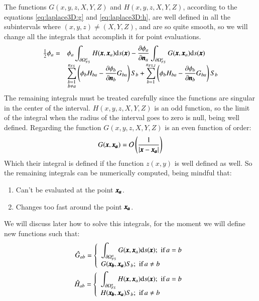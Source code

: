 %
The functions $G(x,y,z,X,Y,Z)$ and $H(x,y,z,X,Y,Z)$, according to the equations
\ref{eq:laplace3D:g} and \ref{eq:laplace3D:h}, are well defined in all the
subintervals where $(x,y,z) \neq (X,Y,Z)$, and are so quite smooth, so we will
change all the integrals that accomplish it for point evaluations.
%
\begin{eqnarray}
	\label{eq:laplace3D:reciprocal_relation:004}
	\begin{array}{rl}
	\frac{1}{2} \phi_a = &
		\phi_a
		\dsty \int_{\partial \Omega_{FS}^a} H(\bs{x}, \bs{x}_a) \mbox{d} s(\bs{x})
	-
		\frac{\partial \phi_a}{\partial \bs{n}_a}
		\dsty \int_{\partial \Omega_{FS}^a} G(\bs{x}, \bs{x}_a) \mbox{d} s(\bs{x})
	\\
	&
	\dsty \sum_{\substack{b = 1 \\ b \neq a}}^{n_{FS}}
	\left(
		\phi_b H_{ba} - \frac{\partial \phi_b}{\partial \bs{n}_b} G_{ba}
	\right) S_b
	+
	\dsty \sum_{b=1}^{n_{FS,I}}
	\left(
		\phi_b H_{ba} - \frac{\partial \phi_b}{\partial \bs{n}_b} G_{ba}
	\right) S_b
	\end{array}
\end{eqnarray}
%
The remaining integrals must be treated carefully since the functions are
singular in the center of the interval. $H(x,y,z,X,Y,Z)$ is an odd function,
so the limit of the integral when the radius of the interval goes to zero
is null, being well defined. Regarding the function $G(x,y,z,X,Y,Z)$ is an
even function of order:
%
\begin{eqnarray*}
	G(\bs{x},\bs{x_a}) = \mathcal{O}\left(\frac{1}{\vert \bs{x} - \bs{x_a}\vert}\right)
\end{eqnarray*}
%
Which their integral is defined if the function $z(x,y)$ is well defined
as well. So the remaining integrals can be numerically computed, being mindful
that:
%
\begin{enumerate}
	\item Can't be evaluated at the point $\bs{x_a}$.
	\item Changes too fast around the point $\bs{x_a}$.
\end{enumerate}
%
We will discuss later how to solve this integrals, for the moment we will define
new functions such that:
%
\begin{eqnarray}
	\label{eq:laplace3D:g:hat}
	\hat G_{ab} = 
	\left\lbrace \begin{array}{l}
		\dsty \int_{\partial \Omega_{FS}^a} G(\bs{x}, \bs{x}_a) \mbox{d} s(\bs{x}); \, \, \mbox{if} \, a = b
		\\
		G(\bs{x_b},\bs{x_a}) S_b; \, \, \mbox{if} \, a \neq b
	\end{array} \right.
	\\
	\label{eq:laplace3D:h:hat}
	\hat H_{ab} = 
	\left\lbrace \begin{array}{l}
		\dsty \int_{\partial \Omega_{FS}^a} H(\bs{x}, \bs{x}_a) \mbox{d} s(\bs{x}); \, \, \mbox{if} \, a = b
		\\
		H(\bs{x_b},\bs{x_a}) S_b; \, \, \mbox{if} \, a \neq b
	\end{array} \right.
\end{eqnarray}
